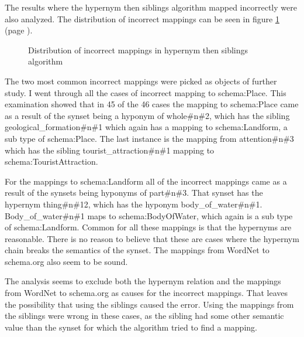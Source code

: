 The results where the hypernym then siblings algorithm mapped incorrectly were also analyzed.
The distribution of incorrect mappings can be seen in figure \ref{fig:incorrect} (page \pageref{fig:incorrect}).

\begin{figure}[ht]
	\centering
	\caption{Distribution of incorrect mappings in hypernym then siblings algorithm}
	\label{fig:incorrect}
\end{figure}

The two most common incorrect mappings were picked as objects of further study.
I went through all the cases of incorrect mapping to schema:Place.
This examination showed that in 45 of the 46 cases the mapping to schema:Place came as a result of
the synset being a hyponym of whole\#n\#2, which has the sibling geological\_formation\#n\#1 which again has a mapping to
schema:Landform, a sub type of schema:Place.
The last instance is the mapping from attention\#n\#3 which has the sibling tourist\_attraction\#n\#1 mapping to
schema:TouristAttraction.

For the mappings to schema:Landform all of the incorrect mappings came as a result of the synsets being hyponyms of part\#n\#3.
That synset has the hypernym thing\#n\#12, which has the hyponym body\_of\_water\#n\#1.
Body\_of\_water\#n\#1 maps to schema:BodyOfWater, which again is a sub type of schema:Landform.
Common for all these mappings is that the hypernyms are reasonable.
There is no reason to believe that these are cases where the hypernym chain breaks the semantics of the synset.
The mappings from WordNet to schema.org also seem to be sound.

The analysis seems to exclude both the hypernym relation and the mappings from WordNet to schema.org as causes for the incorrect mappings.
That leaves the possibility that using the siblings caused the error.
Using the mappings from the siblings were wrong in these cases,
as the sibling had some other semantic value than the synset for which the algorithm tried to find a mapping.

